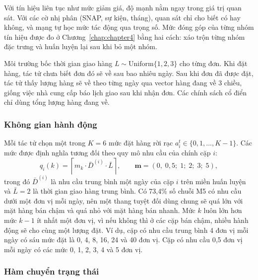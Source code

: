Với tín hiệu liên tục như mức giảm giá, độ mạnh nằm ngay trong giá trị quan sát. Với các cờ nhị phân (SNAP, sự kiện, tháng), quan sát chỉ cho biết có hay không, và mạng tự học mức tác động qua trọng số. Mức đóng góp của từng nhóm tín hiệu được đo ở Chương~\ref{chap:chapter4} bằng hai cách: xáo trộn từng nhóm đặc trưng và huấn luyện lại sau khi bỏ một nhóm.


Môi trường bốc thời gian giao hàng $L \sim \mathrm{Uniform}\{1, 2, 3\}$ cho từng đơn. Khi đặt hàng, tác tử chưa biết đơn đó sẽ về sau bao nhiêu ngày. Sau khi đơn đã được đặt, tác tử thấy lượng hàng sẽ về theo từng ngày qua vector hàng đang về 3 chiều, giống việc nhà cung cấp báo lịch giao sau khi nhận đơn. Các chính sách cổ điển chỉ dùng tổng lượng hàng đang về.

\subsubsection{Không gian hành động}

Mỗi tác tử chọn một trong $K = 6$ mức đặt hàng rời rạc $a_i^t \in \{0, 1, \ldots, K-1\}$. Các mức được định nghĩa tương đối theo quy mô nhu cầu của chính cặp $i$:
\begin{equation}
    q_i(k) = \left\lceil m_k \cdot \bar{D}^{(i)} \cdot \bar{L} \right\rceil,
    \qquad
    \mathbf{m} = (0{,}\; 0{,}5;\; 1;\; 2;\; 3;\; 5),
    \label{eq:orderTable}
\end{equation}
trong đó $\bar{D}^{(i)}$ là nhu cầu trung bình một ngày của cặp $i$ trên miền huấn luyện và $\bar{L} = 2$ là thời gian giao hàng trung bình. Có 73,4\% số chuỗi M5 có nhu cầu dưới một đơn vị mỗi ngày, nên một thang tuyệt đối dùng chung sẽ quá lớn với mặt hàng bán chậm và quá nhỏ với mặt hàng bán nhanh. Mức $k$ luôn lớn hơn mức $k-1$ ít nhất một đơn vị, vì nếu không thì ở các cặp bán chậm, nhiều hành động sẽ cho cùng một lượng đặt. Ví dụ, cặp có nhu cầu trung bình 4 đơn vị mỗi ngày có sáu mức đặt là 0, 4, 8, 16, 24 và 40 đơn vị. Cặp có nhu cầu 0,5 đơn vị mỗi ngày có các mức 0, 1, 2, 3, 4 và 5 đơn vị.

\subsubsection{Hàm chuyển trạng thái}

